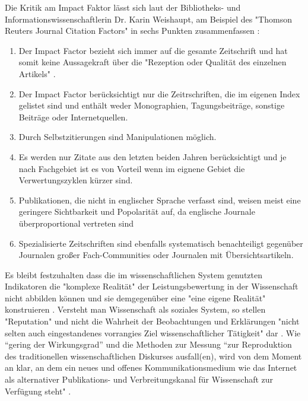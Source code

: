 Die Kritik am Impact Faktor lässt sich laut der Bibliotheks- und Informationswissenschaftlerin Dr. Karin Weishaupt, am Beispiel des "Thomson Reuters Journal Citation Factors" in sechs Punkten zusammenfassen \cite{weishaupt_2009_goldenOA}:
\begin{enumerate}
\item Der Impact Factor bezieht sich immer auf die gesamte Zeitschrift und hat somit keine Aussagekraft über die "Rezeption oder Qualität des einzelnen Artikels" .
\item Der Impact Factor berücksichtigt nur die Zeitrschriften, die im eigenen Index gelistet sind und enthält weder Monographien, Tagungsbeiträge, sonstige Beiträge oder Internetquellen.
\item Durch Selbstzitierungen sind Manipulationen möglich.
\item Es werden nur Zitate aus den letzten beiden Jahren berücksichtigt und je nach Fachgebiet ist es von Vorteil wenn im eignene Gebiet die Verwertungszyklen kürzer sind.
\item Publikationen, die nicht in englischer Sprache verfasst sind, weisen meist eine geringere Sichtbarkeit und Popolarität auf, da englische Journale überproportional vertreten sind
\item Spezialisierte Zeitschriften sind ebenfalls systematisch benachteiligt gegenüber Journalen großer Fach-Communities oder Journalen mit Übersichtsartikeln.
\end{enumerate}

Es bleibt festzuhalten dass die im wissenschaftlichen System genutzten Indikatoren die "komplexe Realität" der Leistungsbewertung in der Wissenschaft nicht abbilden können und sie demgegenüber eine "eine eigene Realität" konstruieren \cite{Hornbostel_1997}. Versteht man Wissenschaft als soziales System, so stellen "Reputation" und nicht die Wahrheit der Beobachtungen und Erklärungen "nicht selten auch eingestandenes vorrangies Ziel wissenschaftlicher Tätigkeit" dar \cite{luhmann_1970_selbststeuerung}. Wie “gering der Wirkungsgrad” und die Methoden zur Messung “zur Reproduktion des traditionellen wissenschaftlichen Diskurses ausfall(en), wird von dem Moment an klar, an dem ein neues und offenes Kommunikationsmedium wie das Internet als alternativer Publikations- und Verbreitungskanal für Wissenschaft zur Verfügung steht" \cite{Rost_1998}. 

